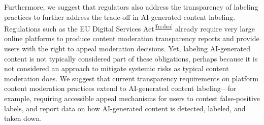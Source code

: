 Furthermore, we suggest that regulators also address the transparency of labeling practices to further address the trade-off in AI-generated content labeling. Regulations such as the EU Digital Services Act\textsuperscript{\ref{fn:dsa}} already require very large online platforms to produce content moderation transparency reports and provide users with the right to appeal moderation decisions. Yet, labeling AI-generated content is not typically considered part of these obligations, perhaps because it is not considered an approach to mitigate systemic risks as typical content moderation does. We suggest that current transparency requirements on platform content moderation practices extend to AI-generated content labeling---for example, requiring accessible appeal mechanisms for users to contest false-positive labels, and report data on how AI-generated content is detected, labeled, and taken down.





